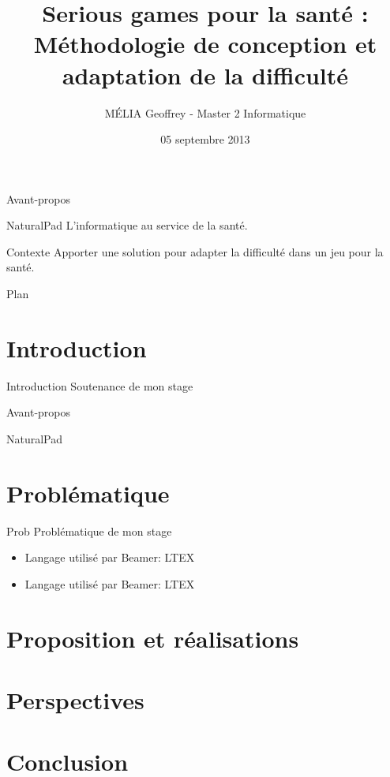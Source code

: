 \documentclass{beamer}
\title[Conception et adaptation des Serious Games]{Serious games pour la santé :\\ Méthodologie de conception et adaptation de la difficulté}
\author{MÉLIA Geoffrey - Master 2 Informatique}
\institute{Université Montpellier II - NaturalPad}
\date{05 septembre 2013}
\begin{document}
\begin{frame}
	\titlepage
\end{frame}

\begin{frame}{Avant-propos}
	\begin{block}{NaturalPad}
		L'informatique au service de la santé.
	\end{block}		
	\begin{block}{Contexte}
		Apporter une solution pour adapter la difficulté dans un jeu pour la santé.
	\end{block}		
\end{frame}

\begin{frame}{Plan}
	\tableofcontents
\end{frame}


\section{Introduction}
	\begin{frame}{Introduction}
		Soutenance de mon stage
	\end{frame}
	
	\begin{frame}{Avant-propos}
	\begin{block}{NaturalPad}
		
	\end{block}		
\end{frame}

\section{Problématique}
	\begin{frame}{Prob}
		Problématique de mon stage
	\end{frame}

	\begin{frame}
		\begin{itemize}
			\item Langage utilisé par Beamer: L\uncover<2->{A}TEX
			\item Langage utilisé par Beamer: L\only<2->{A}TEX
		\end{itemize}
	\end{frame}
	
\section{Proposition et réalisations}	
	\begin{frame}
	
	\end{frame}

\section{Perspectives}
	\begin{frame}
	
	\end{frame}

\section{Conclusion}
	\begin{frame}
	
	\end{frame}
\end{document}

